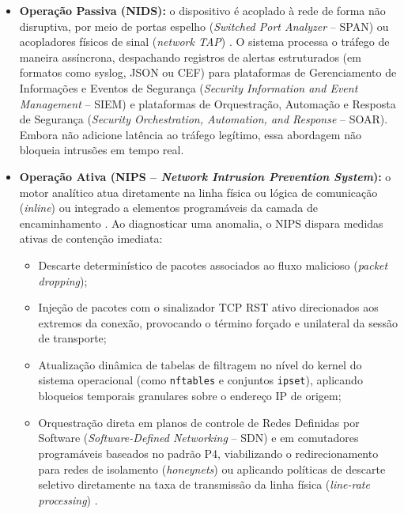 \begin{itemize}
    \item \textbf{Operação Passiva (NIDS):} o dispositivo é acoplado à rede de forma não disruptiva, por meio de portas espelho (\emph{Switched Port Analyzer} -- SPAN) ou acopladores físicos de sinal (\emph{network TAP}) \cite{advancedids2024}. O sistema processa o tráfego de maneira assíncrona, despachando registros de alertas estruturados (em formatos como syslog, JSON ou CEF) para plataformas de Gerenciamento de Informações e Eventos de Segurança (\emph{Security Information and Event Management} -- SIEM) e plataformas de Orquestração, Automação e Resposta de Segurança (\emph{Security Orchestration, Automation, and Response} -- SOAR). Embora não adicione latência ao tráfego legítimo, essa abordagem não bloqueia intrusões em tempo real.
    
    \item \textbf{Operação Ativa (NIPS -- \emph{Network Intrusion Prevention System}):} o motor analítico atua diretamente na linha física ou lógica de comunicação (\emph{inline}) ou integrado a elementos programáveis da camada de encaminhamento \cite{p4nids2025, fogids2024}. Ao diagnosticar uma anomalia, o NIPS dispara medidas ativas de contenção imediata:
    \begin{itemize}
        \item Descarte determinístico de pacotes associados ao fluxo malicioso (\emph{packet dropping});
        \item Injeção de pacotes com o sinalizador TCP RST ativo direcionados aos extremos da conexão, provocando o término forçado e unilateral da sessão de transporte;
        \item Atualização dinâmica de tabelas de filtragem no nível do kernel do sistema operacional (como \texttt{nftables} e conjuntos \texttt{ipset}), aplicando bloqueios temporais granulares sobre o endereço IP de origem;
        \item Orquestração direta em planos de controle de Redes Definidas por Software (\emph{Software-Defined Networking} -- SDN) e em comutadores programáveis baseados no padrão P4, viabilizando o redirecionamento para redes de isolamento (\emph{honeynets}) ou aplicando políticas de descarte seletivo diretamente na taxa de transmissão da linha física (\emph{line-rate processing}) \cite{p4nids2025}.
    \end{itemize}
\end{itemize}


